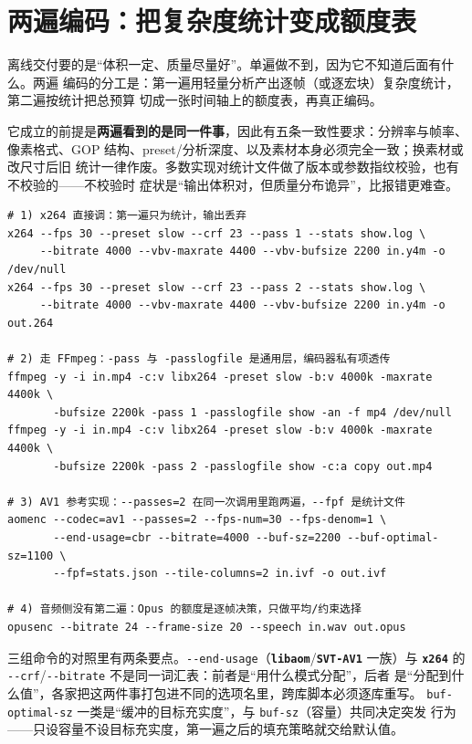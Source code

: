 \documentclass[12pt,a4paper,fontset=fandol]{ctexbook}
\newcommand{\Tp}[1]{\texttt{#1}}
\newcommand{\Opt}[1]{\texttt{-\/-#1}}
\newcommand{\Bk}{\discretionary{}{}{}}
\newcommand{\Lib}[1]{\textbf{\texttt{#1}}}
\begin{document}
\section{两遍编码：把复杂度统计变成额度表}

离线交付要的是``体积一定、质量尽量好''。单遍做不到，因为它不知道后面有什么。两遍
编码的分工是：第一遍用轻量分析产出逐帧（或逐宏块）复杂度统计，第二遍按统计把总预算
切成一张时间轴上的额度表，再真正编码。

它成立的前提是\textbf{两遍看到的是同一件事}，因此有五条一致性要求：分辨率与帧率、
像素格式、GOP 结构、preset/分析深度、以及素材本身必须完全一致；换素材或改尺寸后旧
统计一律作废。多数实现对统计文件做了版本或参数指纹校验，也有不校验的——不校验时
症状是``输出体积对，但质量分布诡异''，比报错更难查。

\begin{lstlisting}[style=shellstyle,caption={三组两遍写法对照：x264 手工两遍、FFmpeg 透传、AV1 一次调用内两遍},label={lst:ch07-twopass}]
# 1) x264 直接调：第一遍只为统计，输出丢弃
x264 --fps 30 --preset slow --crf 23 --pass 1 --stats show.log \
     --bitrate 4000 --vbv-maxrate 4400 --vbv-bufsize 2200 in.y4m -o /dev/null
x264 --fps 30 --preset slow --crf 23 --pass 2 --stats show.log \
     --bitrate 4000 --vbv-maxrate 4400 --vbv-bufsize 2200 in.y4m -o out.264

# 2) 走 FFmpeg：-pass 与 -passlogfile 是通用层，编码器私有项透传
ffmpeg -y -i in.mp4 -c:v libx264 -preset slow -b:v 4000k -maxrate 4400k \
       -bufsize 2200k -pass 1 -passlogfile show -an -f mp4 /dev/null
ffmpeg -y -i in.mp4 -c:v libx264 -preset slow -b:v 4000k -maxrate 4400k \
       -bufsize 2200k -pass 2 -passlogfile show -c:a copy out.mp4

# 3) AV1 参考实现：--passes=2 在同一次调用里跑两遍，--fpf 是统计文件
aomenc --codec=av1 --passes=2 --fps-num=30 --fps-denom=1 \
       --end-usage=cbr --bitrate=4000 --buf-sz=2200 --buf-optimal-sz=1100 \
       --fpf=stats.json --tile-columns=2 in.ivf -o out.ivf

# 4) 音频侧没有第二遍：Opus 的额度是逐帧决策，只做平均/约束选择
opusenc --bitrate 24 --frame-size 20 --speech in.wav out.opus
\end{lstlisting}

三组命令的对照里有两条要点。\Opt{end-usage}（\Lib{libaom}/{\Bk}\Lib{SVT-AV1} 一族）与
\Lib{x264} 的 \Opt{crf}/{\Bk}\Opt{bitrate} 不是同一词汇表：前者是``用什么模式分配''，后者
是``分配到什么值''，各家把这两件事打包进不同的选项名里，跨库脚本必须逐库重写。
\Tp{buf-optimal-sz} 一类是``缓冲的目标充实度''，与 \Tp{buf-sz}（容量）共同决定突发
行为——只设容量不设目标充实度，第一遍之后的填充策略就交给默认值。
\end{document}
